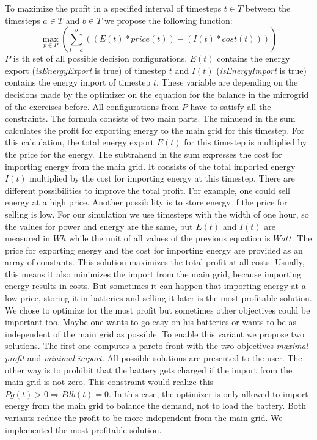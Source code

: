 To maximize the profit in a specified interval of timesteps $t \in T$ between the timesteps $a \in T$ and $b \in T$ we propose the following function:
\begin{equation} \label{eq:opt}
\max_{p \in P}{(\sum_{t=a}^{b}{((E(t)*price(t))-(I(t)*cost(t)))})}
\end{equation}
$P$ is th set of all possible decision configurations.
$E(t)$ contains the energy export (\textit{isEnergyExport} is true) of timestep $t$ and $I(t)$ (\textit{isEnergyImport} is true) contains the energy import of timestep $t$.
These variable are depending on the decisions made by the optimizer on the equation for the balance in the microgrid of the exercises before. 
All configurations from $P$ have to satisfy all the constraints. 
The formula consists of two main parts. 
The minuend in the sum calculates the profit for exporting energy to the main grid for this timestep. 
For this calculation, the total energy export $E(t)$ for this timestep is multiplied by the price for the energy. 
The subtrahend in the sum expresses the cost for importing energy from the main grid. 
It consists of the total imported energy $I(t)$ multiplied by the cost for importing energy at this timestep. 
There are different possibilities to improve the total profit. 
For example, one could sell energy at a high price. 
Another possibility is to store energy if the price for selling is low. 
For our simulation we use timesteps with the width of one hour, so the values for power and energy are the same, but $E(t)$ and $I(t)$ are measured in $Wh$ while the unit of all values of the previous equation is $Watt$. The price for exporting energy and the cost for importing energy are provided as an array of constants.
This solution maximizes the total profit at all costs. Usually, this means it also minimizes the import from the main grid, because importing energy results in costs. But sometimes it can happen that importing energy at a low price, storing it in batteries and selling it later is the most profitable solution. We chose to optimize for the most profit but sometimes other objectives could be important too. Maybe one wants to go easy on his batteries or wants to be as independent of the main grid as possible. To enable this variant we propose two solutions. The first one computes a pareto front with the two objectives \textit{maximal profit} and \textit{minimal import}. All possible solutions are presented to the user.
The other way is to prohibit that the battery gets charged if the import from the main grid is not zero. This constraint would realize this $Pg(t) > 0 \Rightarrow Pdb(t) = 0$.
In this case, the optimizer is only allowed to import energy from the main grid to balance the demand, not to load the battery.
Both variants reduce the profit to be more independent from the main grid. We implemented the most profitable solution.


